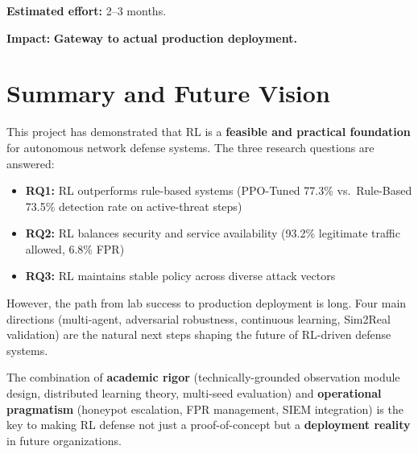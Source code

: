 \documentclass[12pt,a4paper]{report}
\begin{document}
\textbf{Estimated effort:} 2--3 months.

\textbf{Impact:} \textbf{Gateway to actual production deployment.}

\section{Summary and Future Vision}

This project has demonstrated that RL is a \textbf{feasible and practical foundation} for autonomous network defense systems. The three research questions are answered:
\begin{itemize}
  \item \textbf{RQ1:} RL outperforms rule-based systems (PPO-Tuned 77.3\% vs.\ Rule-Based 73.5\% detection rate on active-threat steps)
  \item \textbf{RQ2:} RL balances security and service availability (93.2\% legitimate traffic allowed, 6.8\% FPR)
  \item \textbf{RQ3:} RL maintains stable policy across diverse attack vectors
\end{itemize}

However, the path from lab success to production deployment is long. Four main directions (multi-agent, adversarial robustness, continuous learning, Sim2Real validation) are the natural next steps shaping the future of RL-driven defense systems.

The combination of \textbf{academic rigor} (technically-grounded observation module design, distributed learning theory, multi-seed evaluation) and \textbf{operational pragmatism} (honeypot escalation, FPR management, SIEM integration) is the key to making RL defense not just a proof-of-concept but a \textbf{deployment reality} in future organizations.
\end{document}
